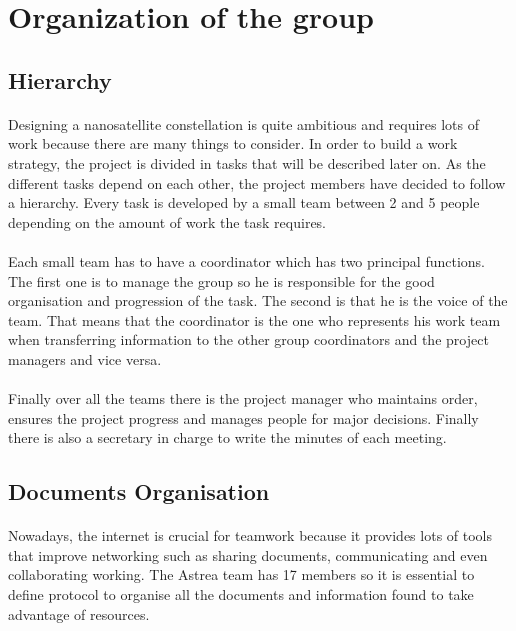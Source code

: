 \section{Organization of the group}


\subsection{Hierarchy}
\paragraph{}
Designing a nanosatellite constellation is quite ambitious and requires lots of work because there are many things to consider. In order to build a work strategy, the project is divided in tasks that will be described later on. As the different tasks depend on each other, the project members have decided to follow a hierarchy. Every task is developed by a small team between 2 and 5 people depending on the amount of work the task requires.
\paragraph{}
Each small team has to have a coordinator which has two principal functions. The first one is to manage the group so he is responsible for the good organisation and progression of the task. The second is that he is the voice of the team. That means that the coordinator is the one who represents his work team when transferring information to the other group coordinators and the project managers and vice versa. 
\paragraph{}
Finally over all the teams there is the project manager who maintains order, ensures the project progress and manages people for major decisions. Finally there is also a secretary in charge to write the minutes of each meeting.


\subsection{Documents Organisation}
\paragraph{}
Nowadays, the internet is crucial for teamwork because it provides lots of tools that improve networking such as sharing documents, communicating and even collaborating working. The Astrea team has 17 members so it is essential to define protocol to organise all the documents and information found to take advantage of resources. 

